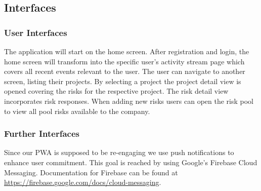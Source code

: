 \subsection{Interfaces}
\label{sec:domainBe}

\subsubsection{User Interfaces}
\label{sec:domainBea}
The application will start on the home screen. After registration and login, the home screen will transform into the specific user's activity stream page which covers all recent events relevant to the user. The user can navigate to another screen, listing their projects. By selecting a project the project detail view is opened covering the risks for the respective project. The risk detail view incorporates risk responses.
When adding new risks users can open the risk pool to view all pool risks available to the company.
\subsubsection{Further Interfaces}
\label{sec:domainBeb}
Since our  \acs{PWA} is supposed to be re-engaging we use push notifications to enhance user commitment. This goal is reached by using Google's Firebase Cloud Messaging. Documentation for Firebase can be found at \href{https://firebase.google.com/docs/cloud-messaging}{https://firebase.google.com/docs/cloud-messaging}.

